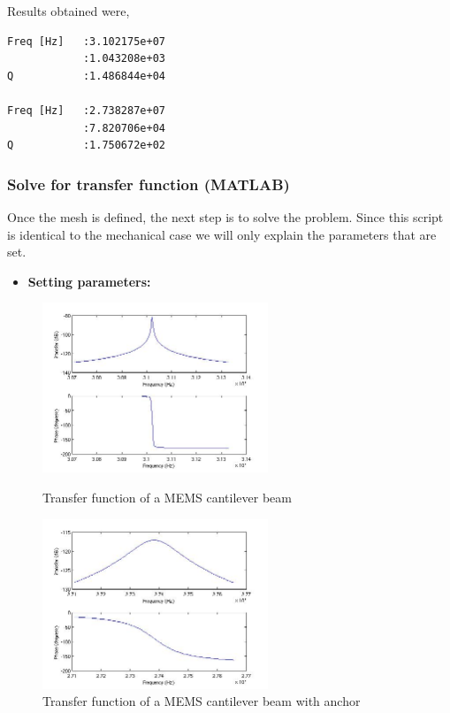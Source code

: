 Results obtained were,
\begin{verbatim}
Freq [Hz]   :3.102175e+07
            :1.043208e+03
Q           :1.486844e+04

Freq [Hz]   :2.738287e+07
            :7.820706e+04
Q           :1.750672e+02
\end{verbatim}

\clearpage
\subsubsection*{Solve for transfer function  (MATLAB)}
Once the mesh is defined, the next step is to solve the problem.
Since this script is identical to the mechanical case we will only 
explain the parameters that are set.
\begin{itemize}

  \item{\textbf{Setting parameters:}}

\end{itemize}

\begin{figure}
\centering
\includegraphics[height = 2in]{fig/mems_cant_te_tra.jpg}
\caption{Transfer function of a MEMS cantilever beam}
\label{fig:MEMSCantileverBeamTETransfer}
\includegraphics[height = 2in]{fig/mems_cant_wa_te_tra.jpg}
\caption{Transfer function of a MEMS cantilever beam with anchor}
\label{fig:MEMSCantileverBeamWaTETransfer}
\end{figure}




